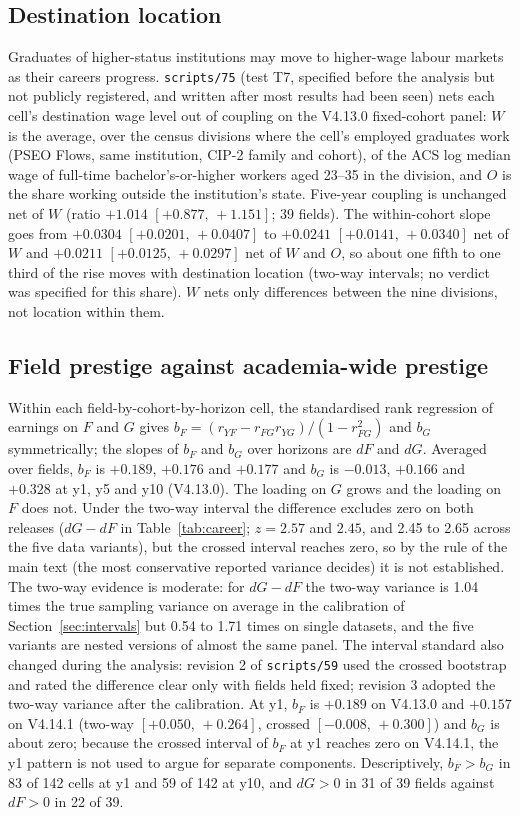 \documentclass[11pt]{article}
\newcommand{\ci}[2]{$[#1,\allowbreak\,#2]$}
\newcommand{\scr}[1]{\texttt{scripts/#1}}
\begin{document}
\subsection{Destination location}\label{sec:destination}

Graduates of higher-status institutions may move to higher-wage labour markets as their careers progress.
\scr{75} (test T7, specified before the analysis but not publicly registered, and written after most results had
been seen) nets each cell's
destination wage level out of coupling on the V4.13.0 fixed-cohort panel: $W$ is the average, over the census
divisions where the cell's employed graduates work (PSEO Flows, same institution, CIP-2 family and cohort), of the
ACS log median wage of full-time bachelor's-or-higher workers aged 23--35 in the division, and $O$ is the share
working outside the institution's state. Five-year coupling is unchanged net of $W$ (ratio $+1.014$
\ci{+0.877}{+1.151}; 39 fields). The within-cohort slope goes from $+0.0304$ \ci{+0.0201}{+0.0407} to $+0.0241$
\ci{+0.0141}{+0.0340} net of $W$ and $+0.0211$ \ci{+0.0125}{+0.0297} net of $W$ and $O$, so about one fifth to one third
of the rise moves with destination location (two-way intervals; no verdict was specified for this share). $W$
nets only differences between the nine divisions, not location within them.

\subsection{Field prestige against academia-wide prestige}\label{sec:bfbg}

Within each field-by-cohort-by-horizon cell, the standardised rank regression of earnings on $F$ and $G$ gives
$b_F=(r_{YF}-r_{FG}r_{YG})/(1-r_{FG}^2)$ and $b_G$ symmetrically; the slopes of $b_F$ and $b_G$ over horizons are $dF$
and $dG$. Averaged over fields, $b_F$ is $+0.189$, $+0.176$ and $+0.177$ and $b_G$ is $-0.013$, $+0.166$ and $+0.328$ at y1, y5 and
y10 (V4.13.0). The loading on $G$ grows and the loading on $F$ does not. Under the two-way interval the difference
excludes zero on both releases ($dG-dF$ in Table~\ref{tab:career}; $z=2.57$ and $2.45$, and 2.45 to 2.65 across the
five data variants), but the crossed interval reaches zero, so by the rule of the main text (the most conservative
reported variance decides) it is not established. The two-way evidence is moderate: for $dG-dF$ the two-way variance is 1.04 times the
true sampling variance on average in the calibration of Section~\ref{sec:intervals} but 0.54 to 1.71 times on single
datasets, and the five variants are nested versions of almost the same panel. The interval standard also changed
during the analysis: revision 2 of \scr{59} used the crossed bootstrap and rated the difference clear only with
fields held fixed; revision 3 adopted the two-way variance after the calibration. At y1, $b_F$ is $+0.189$ on
V4.13.0 and $+0.157$ on V4.14.1 (two-way \ci{+0.050}{+0.264}, crossed \ci{-0.008}{+0.300}) and $b_G$ is about zero;
because the crossed interval of $b_F$ at y1 reaches zero on V4.14.1, the y1 pattern is not used to argue for separate
components. Descriptively, $b_F>b_G$ in 83 of 142 cells at y1 and 59 of 142 at y10, and $dG>0$ in 31 of 39 fields
against $dF>0$ in 22 of 39.
\end{document}
